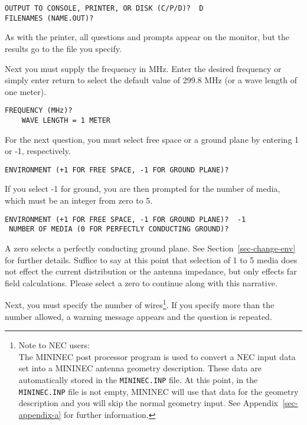 \documentclass[12pt]{article}
\begin{document}
\begin{Verbatim}
OUTPUT TO CONSOLE, PRINTER, OR DISK (C/P/D)?  D
FILENAMES (NAME.OUT)?
\end{Verbatim}

As with the printer, all questions and prompts appear on the monitor,
but the results go to the file you specify.

Next you must supply the frequency in MHz. Enter the desired frequency
or simply enter return to select the default value of 299.8 MHz (or a
wave length of one meter).

\begin{Verbatim}
FREQUENCY (MHz)?
    WAVE LENGTH = 1 METER
\end{Verbatim}

For the next question, you must select free space or a ground plane by
entering 1 or -1, respectively.

\begin{Verbatim}
ENVIRONMENT (+1 FOR FREE SPACE, -1 FOR GROUND PLANE)?
\end{Verbatim}

If you select -1 for ground, you are then prompted for the number of
media, which must be an integer from zero to 5.

\begin{Verbatim}
ENVIRONMENT (+1 FOR FREE SPACE, -1 FOR GROUND PLANE)?  -1
 NUMBER OF MEDIA (0 FOR PERFECTLY CONDUCTING GROUND)?
\end{Verbatim}

A zero selects a perfectly conducting ground plane. See
Section~\ref{sec-change-env} for further details. Suffice to say at this
point that selection of 1 to 5 media does not effect the current
distribution or the antenna impedance, but only effects far field
calculations. Please select a zero to continue along with this
narrative.

Next, you must specify the number of wires\footnote{Note to NEC users:\\
The MININEC post processor program is used to convert a NEC input data
set into a MININEC antenna geometry description. These data are
automatically stored in the \texttt{MININEC.INP} file. At this point, in
the \texttt{MININEC.INP} file is not empty, MININEC will use that data for
the geometry description and you will skip the normal geometry input.
See Appendix~\ref{sec-appendix-a} for further information.}. If you
specify more than the number allowed, a warning message appears and the
question is repeated.
\end{document}
